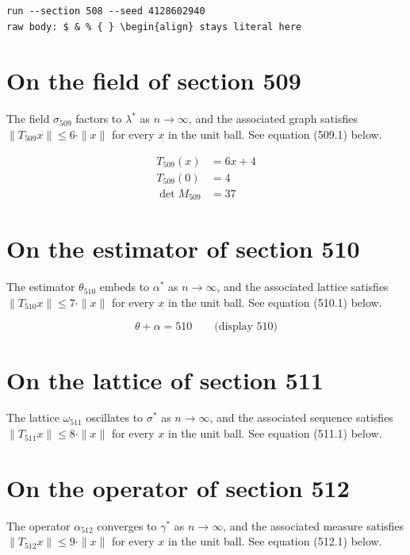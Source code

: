 \documentclass{article}
\begin{document}
\begin{verbatim}
run --section 508 --seed 4128602940
raw body: $ & % { } \begin{align} stays literal here
\end{verbatim}

\section{On the field of section 509}
The field $\sigma_{509}$ factors to $\lambda^{*}$ as $n \to \infty$,
and the associated graph satisfies $\|T_{509} x\| \leq 6 \cdot \|x\|$
for every $x$ in the unit ball. See equation (509.1) below.

\begin{align}
T_{509}(x) &= 6 x + 4 \\
T_{509}(0) &= 4 \\
\det M_{509} &= 37
\end{align}

\section{On the estimator of section 510}
The estimator $\theta_{510}$ embeds to $\alpha^{*}$ as $n \to \infty$,
and the associated lattice satisfies $\|T_{510} x\| \leq 7 \cdot \|x\|$
for every $x$ in the unit ball. See equation (510.1) below.

$$
\theta + \alpha = 510 \qquad \text{(display 510)}
$$

\section{On the lattice of section 511}
The lattice $\omega_{511}$ oscillates to $\sigma^{*}$ as $n \to \infty$,
and the associated sequence satisfies $\|T_{511} x\| \leq 8 \cdot \|x\|$
for every $x$ in the unit ball. See equation (511.1) below.

\section{On the operator of section 512}
The operator $\alpha_{512}$ converges to $\gamma^{*}$ as $n \to \infty$,
and the associated measure satisfies $\|T_{512} x\| \leq 9 \cdot \|x\|$
for every $x$ in the unit ball. See equation (512.1) below.
\end{document}
